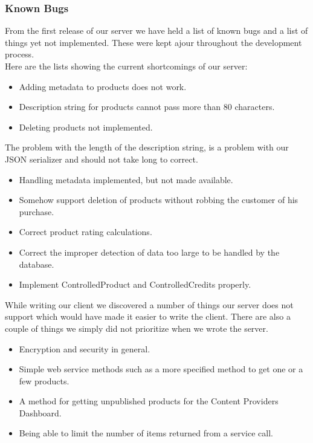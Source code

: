 \subsubsection{Known Bugs}
From the first release of our server we have held a list of known bugs and a list of things yet not implemented. These were kept ajour throughout the development process.
\\Here are the lists showing the current shortcomings of our server:
\begin{itemize}
\item Adding metadata to products does not work.
\item Description string for products cannot pass more than 80 characters.
\item Deleting products not implemented.
\end{itemize}
The problem with the length of the description string, is a problem with our JSON serializer and should not take long to correct.
\begin{itemize}
\item Handling metadata implemented, but not made available.
\item Somehow support deletion of products without robbing the customer of his purchase.
\item Correct product rating calculations.
\item Correct the improper detection of data too large to be handled by the database.
\item Implement ControlledProduct and ControlledCredits properly.
\end{itemize}
While writing our client we discovered a number of things our server does not support which would have made it easier to write the client. There are also a couple of things we simply did not prioritize when we wrote the server.
\begin{itemize}
\item Encryption and security in general.
\item Simple web service methods such as a more specified method to get one or a few products.
\item A method for getting unpublished products for the Content Providers Dashboard.
\item Being able to limit the number of items returned from a service call.
\end{itemize}